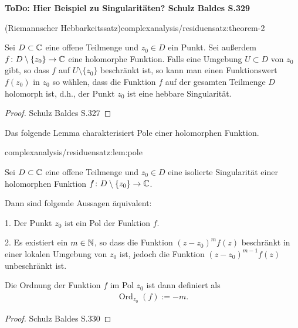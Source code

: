 \par
\textbf{ToDo: Hier Beispiel zu Singularitäten? Schulz Baldes S.329}
\begin{theorem}{(Riemannscher Hebbarkeitssatz)}{complexanalysis/residuensatz:theorem-2}



\par
Sei \(D \subset \mathbb{C}\) eine offene Teilmenge und \(z_0 \in D\) ein Punkt.
Sei außerdem \(f \colon D \setminus \{z_0\} \rightarrow \mathbb{C}\) eine holomorphe Funktion.
Falls eine Umgebung \(U \subset D\) von \(z_0\) gibt, so dass \(f\) auf \(U \setminus \{z_0\}\) beschränkt ist, so kann man einen Funktionswert \(f(z_0)\) in \(z_0\) so wählen, dass die Funktion \(f\) auf der gesamten Teilmenge \(D\) holomorph ist, d.h., der Punkt \(z_0\) ist eine hebbare Singularität.
\end{theorem}

\begin{proof}
 Schulz Baldes S.327
\end{proof}

\par
Das folgende Lemma charakterisiert Pole einer holomorphen Funktion.
\begin{lemma}{}{complexanalysis/residuensatz:lem:pole}



\par
Sei \(D \subset \mathbb{C}\) eine offene Teilmenge und \(z_0 \in D\) eine isolierte Singularität einer holomorphen Funktion \(f \colon D \setminus \{z_0\} \rightarrow \mathbb{C}\).

\par
Dann sind folgende Aussagen äquivalent:

\par
1. Der Punkt \(z_0\) ist ein Pol der Funktion \(f\).

\par
2. Es existiert ein \(m \in \mathbb{N}\), so dass die Funktion \((z - z_0)^m f(z)\) beschränkt in einer lokalen Umgebung von \(z_0\) ist, jedoch die Funktion \((z - z_0)^{m-1} f(z)\) unbeschränkt ist.

\par
Die Ordnung der Funktion \(f\) im Pol \(z_0\) ist dann definiert als
\begin{align*}
\operatorname{Ord}_{z_0}(f) := -m.
\end{align*}\end{lemma}

\begin{proof}
 Schulz Baldes S.330
\end{proof}

